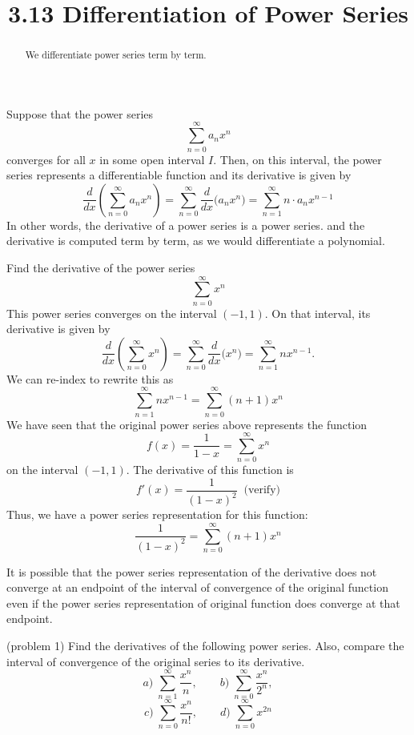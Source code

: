 \documentclass[handout]{ximera}
\title{3.13 Differentiation of Power Series}
\begin{document}
\begin{abstract}
We differentiate power series term by term.
\end{abstract}

\maketitle



Suppose that the power series 
\[
\sum_{n=0}^\infty a_n x^n
\]
converges for all $x$ in some open interval $I$. Then, on this interval, the power series represents a differentiable function and its derivative is given by 
\[
\frac{d}{dx} \left( \sum_{n=0}^\infty a_n x^n \right) = \sum_{n=0}^\infty  \frac{d}{dx}\big( a_n x^n \big)  
= \sum_{n=1}^\infty   n\cdot a_n x^{n-1}
\]
In other words, the derivative of a power series is a power series. and the derivative is computed term by term, as we would differentiate a polynomial.

\begin{example}[example 1]
Find the derivative of the power series
\[
\sum_{n=0}^\infty x^n
\]
This power series converges on the interval $(-1, 1)$.
On that interval, its derivative is given by
\[
\frac{d}{dx}\left( \sum_{n=0}^\infty x^n \right)= \sum_{n=0}^\infty \frac{d}{dx} \big(x^n\big) = \sum_{n=1}^\infty nx^{n-1}.
\]
We can re-index to rewrite this as
\[
\sum_{n=1}^\infty nx^{n-1} = \sum_{n=0}^\infty (n+1)x^n
\]
We have seen that the original power series above represents the function 
\[
f(x) = \frac{1}{1-x} = \sum_{n=0}^\infty x^n
\]
on the interval $(-1, 1)$. The derivative of this function is
\[
f'(x) = \frac{1}{(1-x)^2} \;\; \text{(verify)}
\]
Thus, we have a power series representation for this function:
\[
\frac{1}{(1-x)^2} = \sum_{n=0}^\infty (n+1)x^n
\]
\end{example}

\begin{remark}
It is possible that the power series representation of the derivative does not converge at an endpoint of the interval of 
convergence of the original function even if the power series representation of original 
function does converge at that endpoint.
\end{remark}

\begin{problem}(problem 1)
Find the derivatives of the following power series. 
Also, compare the interval of convergence of the original series to its derivative.
\[
a) \; \sum_{n=1}^\infty \frac{x^n}{n},\qquad  b) \; \sum_{n=0}^\infty \frac{x^n}{2^n},
\]
\[
 c) \; \sum_{n=0}^\infty \frac{x^n}{n!},\qquad d) \; \sum_{n=0}^\infty x^{2n}
\]
\end{problem}
\end{document}
